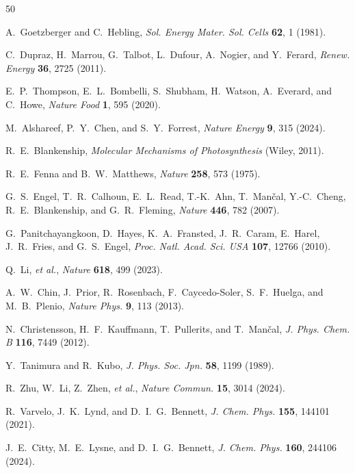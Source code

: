 \documentclass[twocolumn]{article}
\begin{document}
\begin{thebibliography}{50}

A.~Goetzberger and C.~Hebling, \textit{Sol. Energy Mater. Sol. Cells} \textbf{62}, 1 (1981).

C.~Dupraz, H.~Marrou, G.~Talbot, L.~Dufour, A.~Nogier, and Y.~Ferard, \textit{Renew. Energy} \textbf{36}, 2725 (2011).

E.~P.~Thompson, E.~L.~Bombelli, S.~Shubham, H.~Watson, A.~Everard, and C.~Howe, \textit{Nature Food} \textbf{1}, 595 (2020).

M.~Alshareef, P.~Y.~Chen, and S.~Y.~Forrest, \textit{Nature Energy} \textbf{9}, 315 (2024).

R.~E.~Blankenship, \textit{Molecular Mechanisms of Photosynthesis} (Wiley, 2011).

R.~E.~Fenna and B.~W.~Matthews, \textit{Nature} \textbf{258}, 573 (1975).

G.~S.~Engel, T.~R.~Calhoun, E.~L.~Read, T.-K.~Ahn, T.~Man\v{c}al, Y.-C.~Cheng, R.~E.~Blankenship, and G.~R.~Fleming, \textit{Nature} \textbf{446}, 782 (2007).

G.~Panitchayangkoon, D.~Hayes, K.~A.~Fransted, J.~R.~Caram, E.~Harel, J.~R.~Fries, and G.~S.~Engel, \textit{Proc. Natl. Acad. Sci. USA} \textbf{107}, 12766 (2010).

Q.~Li, \textit{et al.}, \textit{Nature} \textbf{618}, 499 (2023).

A.~W.~Chin, J.~Prior, R.~Rosenbach, F.~Caycedo-Soler, S.~F.~Huelga, and M.~B.~Plenio, \textit{Nature Phys.} \textbf{9}, 113 (2013).

N.~Christensson, H.~F.~Kauffmann, T.~Pullerits, and T.~Man\v{c}al, \textit{J. Phys. Chem. B} \textbf{116}, 7449 (2012).

Y.~Tanimura and R.~Kubo, \textit{J. Phys. Soc. Jpn.} \textbf{58}, 1199 (1989).

R.~Zhu, W.~Li, Z.~Zhen, \textit{et al.}, \textit{Nature Commun.} \textbf{15}, 3014 (2024).

R.~Varvelo, J.~K.~Lynd, and D.~I.~G.~Bennett, \textit{J. Chem. Phys.} \textbf{155}, 144101 (2021).

J.~E.~Citty, M.~E.~Lysne, and D.~I.~G.~Bennett, \textit{J. Chem. Phys.} \textbf{160}, 244106 (2024).


\end{thebibliography}
\end{document}

